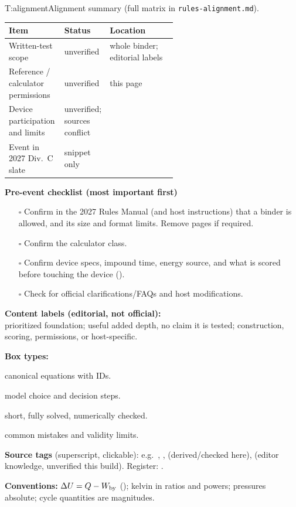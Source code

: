 \begin{multicols}{2}
\begin{reftab}{T:alignment}{Alignment summary (full matrix in \texttt{rules-alignment.md}).}
\small
\begin{tabularx}{\linewidth}{@{}L{0.33\linewidth}L{0.24\linewidth}Y@{}}
\toprule
Item & Status & Location\\
\midrule
Written-test scope & unverified & whole binder; editorial labels\\
Reference / calculator permissions & unverified & this page\\
Device participation and limits & unverified; sources conflict & \\
Event in 2027 Div.\ C slate & snippet only & \\
\bottomrule
\end{tabularx}\end{reftab}

\textbf{Pre-event checklist (most important first)}
\begin{enumerate}
\item[$\square$] Confirm in the 2027 Rules Manual (and host instructions) that a binder is allowed, and its size and format limits. Remove pages if required.
\item[$\square$] Confirm the calculator class.
\item[$\square$] Confirm device specs, impound time, energy source, and what is scored before touching the device ().
\item[$\square$] Check for official clarifications/FAQs and host modifications.
\end{enumerate}

\columnbreak
\textbf{Content labels (editorial, not official):}\\
\CORE{} prioritized foundation; \EXT{} useful added depth, no claim it is tested; \RD{} construction, scoring, permissions, or host-specific.

\textbf{Box types:}
\begin{formulabox}canonical equations with IDs.\end{formulabox}
\begin{keybox}model choice and decision steps.\end{keybox}
\begin{demobox}short, fully solved, numerically checked.\end{demobox}
\begin{trapbox}common mistakes and validity limits.\end{trapbox}

\textbf{Source tags} (superscript, clickable): e.g.\ , ,  (derived/checked here),  (editor knowledge, unverified this build). Register: .

\textbf{Conventions:} $\Delta U=Q-W_{\mathrm{by}}$ (); kelvin in ratios and powers; pressures absolute; cycle quantities are magnitudes.
\end{multicols}

